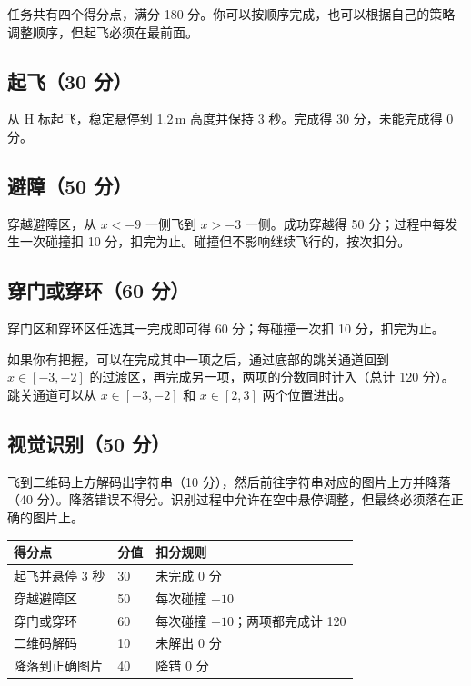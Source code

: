 \documentclass[11pt]{ctexart}
\begin{document}
任务共有四个得分点，满分 180 分。你可以按顺序完成，也可以根据自己的策略调整顺序，但起飞必须在最前面。

\subsection{起飞（30 分）}

从 H 标起飞，稳定悬停到 1.2\,m 高度并保持 3 秒。完成得 30 分，未能完成得 0 分。

\subsection{避障（50 分）}

穿越避障区，从 $x<-9$ 一侧飞到 $x>-3$ 一侧。成功穿越得 50 分；过程中每发生一次碰撞扣 10 分，扣完为止。碰撞但不影响继续飞行的，按次扣分。

\subsection{穿门或穿环（60 分）}

穿门区和穿环区任选其一完成即可得 60 分；每碰撞一次扣 10 分，扣完为止。

如果你有把握，可以在完成其中一项之后，通过底部的跳关通道回到 $x\in[-3,-2]$ 的过渡区，再完成另一项，两项的分数同时计入（总计 120 分）。跳关通道可以从 $x\in[-3,-2]$ 和 $x\in[2,3]$ 两个位置进出。

\subsection{视觉识别（50 分）}

飞到二维码上方解码出字符串（10 分），然后前往字符串对应的图片上方并降落（40 分）。降落错误不得分。识别过程中允许在空中悬停调整，但最终必须落在正确的图片上。

\begin{center}
\begin{tabular}{@{}lll@{}}
\toprule
得分点 & 分值 & 扣分规则 \\
\midrule
起飞并悬停 3 秒 & 30 & 未完成 0 分 \\
穿越避障区 & 50 & 每次碰撞 $-10$ \\
穿门或穿环 & 60 & 每次碰撞 $-10$；两项都完成计 120 \\
二维码解码 & 10 & 未解出 0 分 \\
降落到正确图片 & 40 & 降错 0 分 \\
\bottomrule
\end{tabular}
\end{center}
\end{document}
